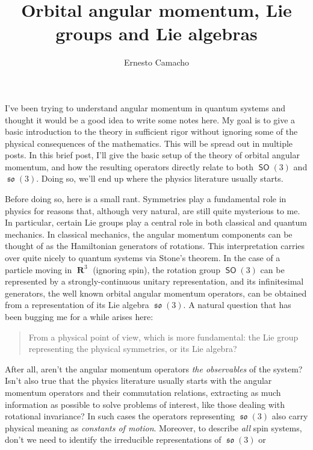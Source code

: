 \documentclass[a4paper]{article}
\title{Orbital angular momentum, Lie groups and Lie
algebras}
\author{Ernesto Camacho}
\DeclareMathOperator{\R}{\mathbf{R}}
\DeclareMathOperator{\SO}{\mathsf{SO}}
\DeclareMathOperator{\so}{\mathfrak{so}}
\begin{document}
    \maketitle

    I've been trying to understand angular momentum in
    quantum systems and thought it would be a good idea to
    write some notes here. My goal is to give a basic
    introduction to the theory in sufficient rigor without
    ignoring some of the physical consequences of the
    mathematics. This will be spread out in multiple posts.
    In this brief post, I'll give the basic setup of the
    theory of orbital angular momentum, and how the
    resulting operators directly relate to both $\SO(3)$ and
    $\so(3)$.  Doing so, we'll end up where the physics
    literature usually starts.

    Before doing so, here is a small rant. Symmetries play a
    fundamental role in physics for reasons that, although
    very natural, are still quite mysterious to me. In
    particular, certain Lie groups play a central role in
    both classical and quantum mechanics. In classical
    mechanics, the angular momentum components can be
    thought of as the Hamiltonian generators of rotations.
    This interpretation carries over quite nicely to quantum
    systems via Stone's theorem. In the case of a particle
    moving in $\R^3$ (ignoring spin), the rotation group
    $\SO(3)$ can be represented by a strongly-continuous
    unitary representation, and its infinitesimal
    generators, the well known orbital angular momentum
    operators, can be obtained from a representation of its
    Lie algebra $\so(3)$. A natural question that has been
    bugging me for a while arises here:
    \begin{quote}
        From a physical point of view, which is more
        fundamental: the Lie group representing the physical
        symmetries, or its Lie algebra?
    \end{quote}
    After all, aren't the angular momentum operators
    \textit{the observables} of the system? Isn't also true
    that the physics literature usually starts
    with the angular momentum operators and their
    commutation relations, extracting as much information as
    possible to solve problems of interest, like those
    dealing with rotational invariance? In such cases the
    operators representing $\so(3)$ also carry physical
    meaning as \textit{constants of motion}.  Moreover, to
    describe \textit{all} spin systems, don't we need to
    identify the irreducible representations of $\so(3)$ or
\end{document}
